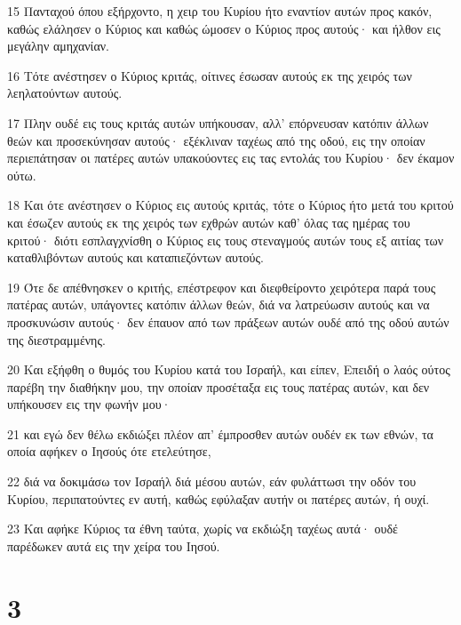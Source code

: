 \par 15 Πανταχού όπου εξήρχοντο, η χειρ του Κυρίου ήτο εναντίον αυτών προς κακόν, καθώς ελάλησεν ο Κύριος και καθώς ώμοσεν ο Κύριος προς αυτούς· και ήλθον εις μεγάλην αμηχανίαν.
\par 16 Τότε ανέστησεν ο Κύριος κριτάς, οίτινες έσωσαν αυτούς εκ της χειρός των λεηλατούντων αυτούς.
\par 17 Πλην ουδέ εις τους κριτάς αυτών υπήκουσαν, αλλ' επόρνευσαν κατόπιν άλλων θεών και προσεκύνησαν αυτούς· εξέκλιναν ταχέως από της οδού, εις την οποίαν περιεπάτησαν οι πατέρες αυτών υπακούοντες εις τας εντολάς του Κυρίου· δεν έκαμον ούτω.
\par 18 Και ότε ανέστησεν ο Κύριος εις αυτούς κριτάς, τότε ο Κύριος ήτο μετά του κριτού και έσωζεν αυτούς εκ της χειρός των εχθρών αυτών καθ' όλας τας ημέρας του κριτού· διότι εσπλαγχνίσθη ο Κύριος εις τους στεναγμούς αυτών τους εξ αιτίας των καταθλιβόντων αυτούς και καταπιεζόντων αυτούς.
\par 19 Ότε δε απέθνησκεν ο κριτής, επέστρεφον και διεφθείροντο χειρότερα παρά τους πατέρας αυτών, υπάγοντες κατόπιν άλλων θεών, διά να λατρεύωσιν αυτούς και να προσκυνώσιν αυτούς· δεν έπαυον από των πράξεων αυτών ουδέ από της οδού αυτών της διεστραμμένης.
\par 20 Και εξήφθη ο θυμός του Κυρίου κατά του Ισραήλ, και είπεν, Επειδή ο λαός ούτος παρέβη την διαθήκην μου, την οποίαν προσέταξα εις τους πατέρας αυτών, και δεν υπήκουσεν εις την φωνήν μου·
\par 21 και εγώ δεν θέλω εκδιώξει πλέον απ' έμπροσθεν αυτών ουδέν εκ των εθνών, τα οποία αφήκεν ο Ιησούς ότε ετελεύτησε,
\par 22 διά να δοκιμάσω τον Ισραήλ διά μέσου αυτών, εάν φυλάττωσι την οδόν του Κυρίου, περιπατούντες εν αυτή, καθώς εφύλαξαν αυτήν οι πατέρες αυτών, ή ουχί.
\par 23 Και αφήκε Κύριος τα έθνη ταύτα, χωρίς να εκδιώξη ταχέως αυτά· ουδέ παρέδωκεν αυτά εις την χείρα του Ιησού.

\chapter{3}

